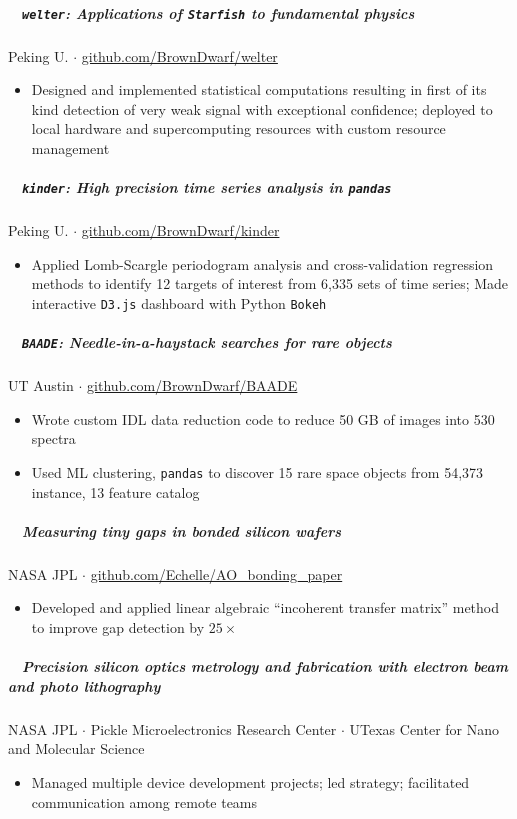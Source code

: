 \documentclass[10pt,letterpaper]{article}
\begin{document}
\subparagraph{\faBullseye ~ \texttt{welter}: Applications of \texttt{Starfish} to fundamental physics}
Peking U. $\cdot$ \href{https://github.com/BrownDwarf/welter/}{github.com/BrownDwarf/welter}
\begin{itemize}
    \item Designed and implemented statistical computations resulting in first of its kind detection of very weak signal with exceptional confidence; deployed to local hardware and supercomputing resources with custom resource management
\end{itemize}

\subparagraph{\faHourglassHalf ~ \texttt{kinder}: High precision time series analysis in \texttt{pandas}}
Peking U. $\cdot$ \href{https://github.com/BrownDwarf/kinder}{github.com/BrownDwarf/kinder}
\begin{itemize}
    \item Applied Lomb-Scargle periodogram analysis and cross-validation regression methods to identify 12 targets of interest from 6,335 sets of time series; Made interactive \texttt{D3.js} dashboard with Python \texttt{Bokeh}
\end{itemize}

\subparagraph{\faBinoculars ~ \texttt{BAADE}: Needle-in-a-haystack searches for rare objects}
UT Austin $\cdot$ \href{https://github.com/BrownDwarf/BAADE}{github.com/BrownDwarf/BAADE}
\begin{itemize}
    \item Wrote custom IDL data reduction code to reduce 50 GB of images into 530 spectra
    \item Used ML clustering, \texttt{pandas} to discover 15 rare space objects from 54,373 instance, 13 feature catalog
\end{itemize}

\subparagraph{\faSuperscript ~ Measuring tiny gaps in bonded silicon wafers}
NASA JPL $\cdot$ \href{https://github.com/Echelle/AO_bonding_paper}{github.com/Echelle/AO\_bonding\_paper}
\begin{itemize}
    \item Developed and applied linear algebraic ``incoherent transfer matrix'' method to improve gap detection by $25\times$
\end{itemize}

\subparagraph{\faIndustry ~ Precision silicon optics metrology and fabrication with electron beam and photo lithography}
\begin{center} NASA JPL $\cdot$ Pickle Microelectronics Research Center $\cdot$ UTexas Center for Nano and Molecular Science \end{center}
\begin{itemize}
    \item Managed multiple device development projects; led strategy; facilitated communication among remote teams
\end{itemize}
\end{document}
